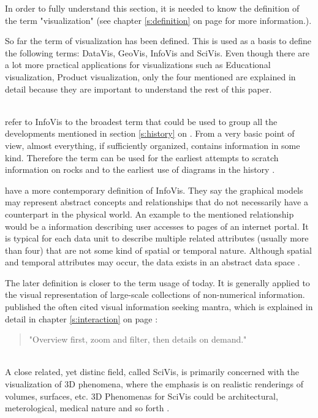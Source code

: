 In order to fully understand this section, it is needed to know the definition of the term "visualization" (see chapter \ref{s:definition} on page \pageref{s:definition} for more information.).

So far the term of visualization has been defined. This is used as a basis to define the following terms: \ac{DataVis}, \ac{GeoVis}, \ac{InfoVis} and \ac{SciVis}. Even though there are a lot more practical applications for visualizations such as Educational visualization, Product visualization, only the four mentioned are explained in detail because they are important to understand the rest of this paper.

\begin{enumerate}

 \hfill \\
\citeauthor{Friendly.2001} refer to \ac{InfoVis} to the broadest term that could be used to group all the developments mentioned in section \ref{s:history} on \pageref{s:history}. From a very basic point of view, almost everything, if sufficiently organized, contains information in some kind. Therefore the term can be used for the earliest attempts to scratch information on rocks and to the earliest use of diagrams in the history .

\citeauthor{Ferreira2003} have a more contemporary definition of \ac{InfoVis}. They say the graphical models may represent abstract concepts and relationships that do not necessarily have a counterpart in the physical world. An example to the mentioned relationship would be a information describing user accesses to pages of an internet portal. It is typical for each data unit to describe multiple related attributes (usually more than four) that are not some kind of spatial or temporal nature. Although spatial and temporal attributes may occur, the data exists in an abstract data space .

The later definition is closer to the term usage of today. It is generally applied to the visual representation of large-scale collections of non-numerical information. \citeauthor{Shneiderman1996} published the often cited visual information seeking mantra, which is explained in detail in chapter \ref{s:interaction} on page \pageref{s:interaction} :
\begin{quote}
"Overview first, zoom and filter, then details on demand."
\end{quote}

 \hfill \\
A close related, yet distinc field, called \ac{SciVis}, is primarily concerned with the visualization of 3D phenomena, where the emphasis is on realistic renderings of volumes, surfaces, etc. 3D Phenomenas for \ac{SciVis} could be architectural, meterological, medical nature and so forth .


\end{enumerate}
